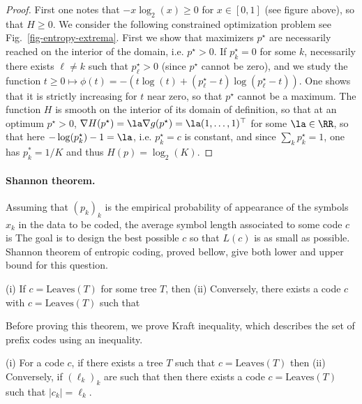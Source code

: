 \begin{proof}
	First one notes that $-x\log_2(x) \geq 0$ for $x \in [0,1]$ (see figure above), so that $H \geq 0$.
	We consider the following constrained optimization problem
	see Fig.~\ref{fig-entropy-extrema}.
	First we show that maximizers $p^\star$ are necessarily reached on the interior of the domain, i.e. $p^\star>0$.
	If $p_k^\star=0$ for some $k$, necessarily there exists $\ell \neq k$ such that $p_\ell^\star>0$ (since $p^\star$ cannot be zero), and we study the function 
	$t \geq 0 \mapsto \phi(t) = - ( t \log(t) + (p_\ell^\star-t) \log(p_\ell^\star-t) )$. One shows that it is strictly increasing for $t$ near zero, so that $p^\star$ cannot be a maximum.	
	The function $H$ is smooth on the interior of its domain of definition, so that 
	at an optimum $p^\star>0$, $\nabla H(p^\star)=\la \nabla g(p^\star) = \la (1,\ldots,1)^\top$ for some $\la \in \RR$, so that here $-\log(p_k^\star)-1 = \la$, i.e. $p_k^\star=c$ is constant, and since  $\sum_k p_k^\star=1$, one has $p_k^*=1/K$ and thus $H(p)=\log_2(K)$.
\end{proof}


\paragraph{Shannon theorem.}

%
Assuming that $(p_k)_k$ is the empirical probability of appearance of the symbols $x_k$ in the data to be coded, the average symbol length associated to some code $c$ is 
The goal is to design the best possible $c$ so that $L(c)$ is as small as possible.
%
Shannon theorem of entropic coding, proved bellow, give both lower and upper bound for this question. 

\begin{thm}
	(i) If $c=\text{Leaves}(T)$ for some tree $T$, then 
	(ii) Conversely, there exists a code $c$ with $c=\text{Leaves}(T)$ such that 
\end{thm} 

Before proving this theorem, we prove Kraft inequality, which describes the set of prefix codes using an inequality.

\begin{lem}\label{lem-kraft}
	(i) For a code $c$, if there exists a tree $T$ such that $c=\text{Leaves}(T)$ then
	(ii) Conversely, if $(\ell_k)_k$ are such that
	then there exists a code $c=\text{Leaves}(T)$ such that $|c_k|=\ell_k$.
\end{lem} 

